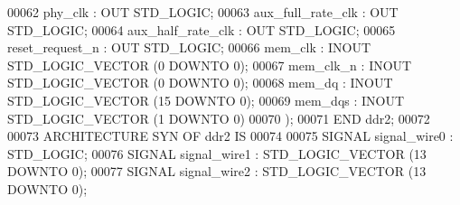 \begin{DoxyCode}
{00062         \textcolor{vhdlchar}{phy_clk} \textcolor{vhdlchar}{:} \textcolor{keywordflow}{OUT} \textcolor{comment}{STD\_LOGIC};
00063         \textcolor{vhdlchar}{aux_full_rate_clk}   \textcolor{vhdlchar}{:} \textcolor{keywordflow}{OUT} \textcolor{comment}{STD\_LOGIC};
00064         \textcolor{vhdlchar}{aux_half_rate_clk}   \textcolor{vhdlchar}{:} \textcolor{keywordflow}{OUT} \textcolor{comment}{STD\_LOGIC};
00065         \textcolor{vhdlchar}{reset_request_n} \textcolor{vhdlchar}{:} \textcolor{keywordflow}{OUT} \textcolor{comment}{STD\_LOGIC};
00066         \textcolor{vhdlchar}{mem_clk} \textcolor{vhdlchar}{:} \textcolor{keywordflow}{INOUT} \textcolor{comment}{STD\_LOGIC\_VECTOR} \textcolor{vhdlchar}{(}\textcolor{vhdllogic}{}\textcolor{vhdllogic}{0} \textcolor{keywordflow}{DOWNTO} \textcolor{vhdllogic}{}\textcolor{vhdllogic}{0}\textcolor{vhdlchar}{)};
00067         \textcolor{vhdlchar}{mem_clk_n}   \textcolor{vhdlchar}{:} \textcolor{keywordflow}{INOUT} \textcolor{comment}{STD\_LOGIC\_VECTOR} \textcolor{vhdlchar}{(}\textcolor{vhdllogic}{}\textcolor{vhdllogic}{0} \textcolor{keywordflow}{DOWNTO} \textcolor{vhdllogic}{}\textcolor{vhdllogic}{0}\textcolor{vhdlchar}{)};
00068         \textcolor{vhdlchar}{mem_dq}  \textcolor{vhdlchar}{:} \textcolor{keywordflow}{INOUT} \textcolor{comment}{STD\_LOGIC\_VECTOR} \textcolor{vhdlchar}{(}\textcolor{vhdllogic}{}\textcolor{vhdllogic}{15} \textcolor{keywordflow}{DOWNTO} \textcolor{vhdllogic}{}\textcolor{vhdllogic}{0}\textcolor{vhdlchar}{)};
00069         \textcolor{vhdlchar}{mem_dqs} \textcolor{vhdlchar}{:} \textcolor{keywordflow}{INOUT} \textcolor{comment}{STD\_LOGIC\_VECTOR} \textcolor{vhdlchar}{(}\textcolor{vhdllogic}{}\textcolor{vhdllogic}{1} \textcolor{keywordflow}{DOWNTO} \textcolor{vhdllogic}{}\textcolor{vhdllogic}{0}\textcolor{vhdlchar}{)}
00070     \textcolor{vhdlchar}{)};
00071 \textcolor{keywordflow}{END} \textcolor{vhdlchar}{ddr2};
00072 
00073 \textcolor{keywordflow}{ARCHITECTURE} SYN \textcolor{keywordflow}{OF} ddr2 IS
00074 
00075     \textcolor{keywordflow}{SIGNAL} \textcolor{vhdlchar}{signal_wire0} \textcolor{vhdlchar}{:}  \textcolor{comment}{STD\_LOGIC};
00076     \textcolor{keywordflow}{SIGNAL} \textcolor{vhdlchar}{signal_wire1} \textcolor{vhdlchar}{:}  \textcolor{comment}{STD\_LOGIC\_VECTOR} \textcolor{vhdlchar}{(}\textcolor{vhdllogic}{}\textcolor{vhdllogic}{13} \textcolor{keywordflow}{DOWNTO} \textcolor{vhdllogic}{}\textcolor{vhdllogic}{0}\textcolor{vhdlchar}{)};
00077     \textcolor{keywordflow}{SIGNAL} \textcolor{vhdlchar}{signal_wire2} \textcolor{vhdlchar}{:}  \textcolor{comment}{STD\_LOGIC\_VECTOR} \textcolor{vhdlchar}{(}\textcolor{vhdllogic}{}\textcolor{vhdllogic}{13} \textcolor{keywordflow}{DOWNTO} \textcolor{vhdllogic}{}\textcolor{vhdllogic}{0}\textcolor{vhdlchar}{)};
}
\end{DoxyCode}
